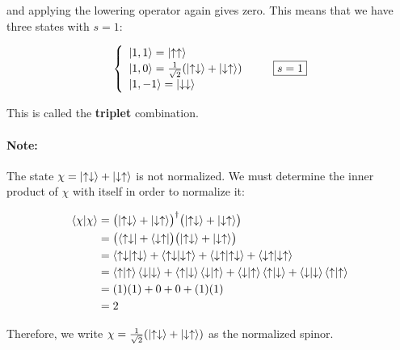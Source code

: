 \documentclass[12pt, titlepage]{article}
\begin{document}
and applying the lowering operator again gives zero. This means that we have three states with $s=1$:

\begin{equation}
	\left\{
	\begin{array}{l}
	\ket{1,1} = \ket{\uparrow\uparrow} \\[2pt]
	\ket{1,0} = \frac{1}{\sqrt{2}}(\ket{\uparrow\downarrow} + \ket{\downarrow\uparrow}) \\[2pt]
	\ket{1, -1} = \ket{\downarrow\downarrow}
	\end{array}
	\right. 
	\qquad \boxed{s=1}
\end{equation}

This is called the \textbf{triplet} combination.

\begin{mdframed}
\paragraph*{Note:} The state $\chi = \ket{\uparrow\downarrow} + \ket{\downarrow\uparrow}$ is not normalized. We must determine the inner product of $\chi$ with itself in order to normalize it:

\begin{align*}
	\bra{\chi}\ket{\chi} &= \bigl(\ket{\uparrow\downarrow} + \ket{\downarrow\uparrow}\bigr)^\dagger\bigl(\ket{\uparrow\downarrow} + \ket{\downarrow\uparrow}\bigr) \\
	&= \bigl(\bra{\uparrow\downarrow} + \bra{\downarrow\uparrow}\bigr)\bigl(\ket{\uparrow\downarrow} + \ket{\downarrow\uparrow}\bigr) \\
	&= \bra{\uparrow\downarrow}\ket{\uparrow\downarrow} + \bra{\uparrow\downarrow}\ket{\downarrow\uparrow} + \bra{\downarrow\uparrow}\ket{\uparrow\downarrow} + \bra{\downarrow\uparrow}\ket{\downarrow\uparrow} \\
	&= \bra{\uparrow}\ket{\uparrow}\bra{\downarrow}\ket{\downarrow} + \bra{\uparrow}\ket{\downarrow}\bra{\downarrow}\ket{\uparrow} + \bra{\downarrow}\ket{\uparrow}\bra{\uparrow}\ket{\downarrow} + \bra{\downarrow}\ket{\downarrow}\bra{\uparrow}\ket{\uparrow} \\
	&= (1)(1) + 0 + 0 + (1)(1) \\
	&= 2
\end{align*}

Therefore, we write $\chi = \frac{1}{\sqrt{2}}(\ket{\uparrow\downarrow} + \ket{\downarrow\uparrow})$ as the normalized spinor.
\end{mdframed}
\clearpage
\end{document}
